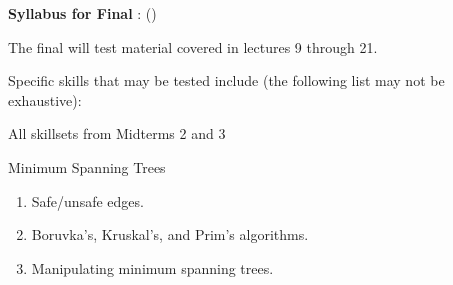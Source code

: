\documentclass{article}%
\begin{document}
\noindent%
{%
   {\Large \bf Syllabus for Final} \hfill %
   \Course{}: \CourseName{} (\Semester)}%

\HrX

\medskip%

The final will test material covered in lectures 9 through
21.


\medskip%
Specific skills that may be tested include (the following list may not
be exhaustive):
\begin{questions}[label=%
    \protect\fcolorbox{questions:2:color}{questions:2:color}%
    {\protect \Large \bf%
       \color{questions:2:fg:color}{\arabic*.}}]
    	\item All skillsets from Midterms 2 and 3
    \item  Minimum Spanning Trees
    \begin{enumerate}
    	\item Safe/unsafe edges.
    	\item Boruvka's, Kruskal's, and Prim's algorithms.
    	\item Manipulating minimum spanning trees.
    \end{enumerate}

\end{questions}
\end{document}

